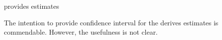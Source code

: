 \citet{BA99} provides estimates


The intention to provide confidence interval for the derives estimates is commendable. However, the usefulness is not clear.
